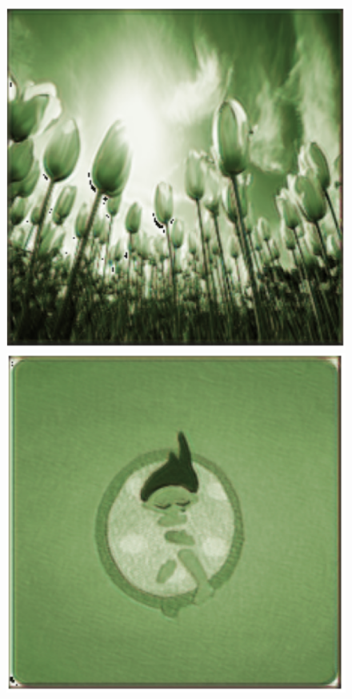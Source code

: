 \documentclass[]{article}
\begin{document}
	\begin{figure}[H]
		\includegraphics[scale=0.35]{m1_1.png}
		\includegraphics[scale=0.35]{m1_2.png}

\end{figure}
\end{document}
